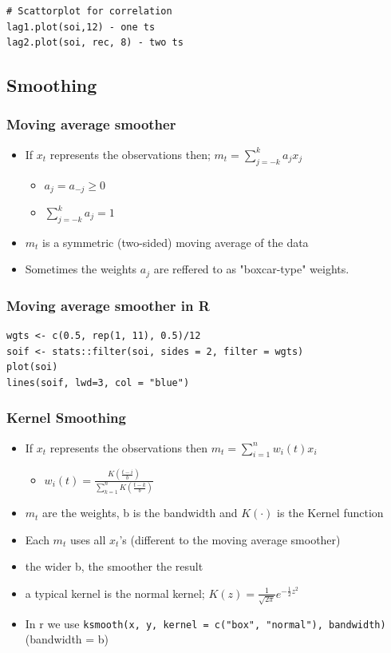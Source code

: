 \documentclass{article}
\begin{document}
\begin{lstlisting}
# Scattorplot for correlation
lag1.plot(soi,12) - one ts
lag2.plot(soi, rec, 8) - two ts
\end{lstlisting}


\subsection{Smoothing}
\subsubsection{Moving average smoother}
\begin{itemize}
    \item If $x_t$ represents the observations then; $m_t = \sum_{j=-k}^k a_j x_j$ 
    \begin{itemize}
        \item $a_j = a_{-j} \geq 0$
        \item $\sum_{j=-k}^k a_j = 1$
    \end{itemize}
    \item $m_t$ is a symmetric (two-sided) moving average of the data
    \item Sometimes the weights $a_j$ are reffered to as "boxcar-type" weights.
\end{itemize}

\subsubsection{Moving average smoother in R}
\begin{lstlisting}
wgts <- c(0.5, rep(1, 11), 0.5)/12
soif <- stats::filter(soi, sides = 2, filter = wgts)
plot(soi)
lines(soif, lwd=3, col = "blue")
\end{lstlisting}

\subsubsection{Kernel Smoothing}

\begin{itemize}
    \item If $x_t$ represents the observations then $m_t = \sum_{i=1}^n w_i(t) x_i$
    \begin{itemize}
        \item $w_i(t) = \frac{K(\frac{t-i}{b})}{\sum_{k=1}^n K(\frac{t-k}{b})}$
    \end{itemize}
    \item $m_t$ are the weights, b is the bandwidth and $K(\cdot)$ is the Kernel function
    \item Each $m_t$ uses all $x_t$'s (different to the moving average smoother)
    \item the wider b, the smoother the result
    \item a typical kernel is the normal kernel; $K(z) = \frac{1}{\sqrt{2 \pi}} e^{-\frac{1}{2}z^2}$
    \item In r we use \texttt{ksmooth(x, y, kernel = c("box", "normal"), bandwidth)} (bandwidth = b)
\end{itemize}
\end{document}
